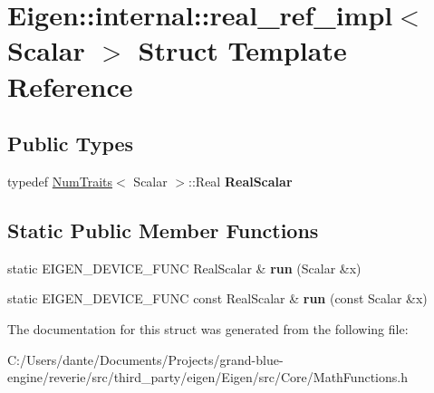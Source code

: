 \hypertarget{struct_eigen_1_1internal_1_1real__ref__impl}{}\section{Eigen\+::internal\+::real\+\_\+ref\+\_\+impl$<$ Scalar $>$ Struct Template Reference}
\label{struct_eigen_1_1internal_1_1real__ref__impl}
\subsection*{Public Types}
\begin{DoxyCompactItemize}
\item 
\mbox{\label{struct_eigen_1_1internal_1_1real__ref__impl_ae4efa0651441048f94f82778414e5d44}} 
typedef \mbox{\hyperlink{struct_eigen_1_1_num_traits}{Num\+Traits}}$<$ Scalar $>$\+::Real {\bfseries Real\+Scalar}
\end{DoxyCompactItemize}
\subsection*{Static Public Member Functions}
\begin{DoxyCompactItemize}
\item 
\mbox{\label{struct_eigen_1_1internal_1_1real__ref__impl_ae9ce89dfa0fe1c49923f839390e5c676}} 
static E\+I\+G\+E\+N\+\_\+\+D\+E\+V\+I\+C\+E\+\_\+\+F\+U\+NC Real\+Scalar \& {\bfseries run} (Scalar \&x)
\item 
\mbox{\label{struct_eigen_1_1internal_1_1real__ref__impl_a7d9b4c81cabd5e5ab0de1f20aec320fb}} 
static E\+I\+G\+E\+N\+\_\+\+D\+E\+V\+I\+C\+E\+\_\+\+F\+U\+NC const Real\+Scalar \& {\bfseries run} (const Scalar \&x)
\end{DoxyCompactItemize}


The documentation for this struct was generated from the following file\+:\begin{DoxyCompactItemize}
\item 
C\+:/\+Users/dante/\+Documents/\+Projects/grand-\/blue-\/engine/reverie/src/third\+\_\+party/eigen/\+Eigen/src/\+Core/Math\+Functions.\+h\end{DoxyCompactItemize}
